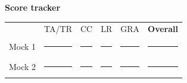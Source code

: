 \documentclass[10pt,a4paper]{article}
\begin{document}
\vfill
\begin{tcolorbox}[enhanced,colback=sand,colframe=gold,boxrule=0.5pt,arc=2mm,
    left=3mm,right=3mm,top=1.5mm,bottom=1.5mm,fontupper=\footnotesize]
\textbf{\sffamily\color{navy}\faRoute\; Score tracker}\hfill
\begin{tabular}{l*{5}{c}}
 & \sffamily TA/TR & \sffamily CC & \sffamily LR & \sffamily GRA & \sffamily \textbf{Overall}\\
\sffamily Mock 1 & \rule{9mm}{0.4pt} & \rule{9mm}{0.4pt} & \rule{9mm}{0.4pt} & \rule{9mm}{0.4pt} & \rule{11mm}{0.4pt}\\[2pt]
\sffamily Mock 2 & \rule{9mm}{0.4pt} & \rule{9mm}{0.4pt} & \rule{9mm}{0.4pt} & \rule{9mm}{0.4pt} & \rule{11mm}{0.4pt}\\
\end{tabular}
\end{tcolorbox}
\end{document}
